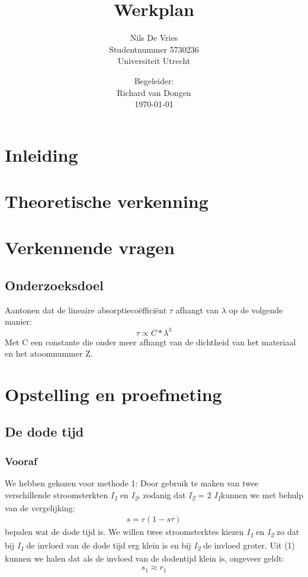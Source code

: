 \documentclass[a4paper]{article}
\begin{document}
\title{Werkplan}
\author{
		\and
		Nils De Vries\\ 
        Studentnummer 5730236  \\
        Universiteit Utrecht
        }

\date{Begeleider: \\ 
Richard van Dongen \\
\today}
\maketitle

\newpage

\section{Inleiding} 
\label{sec:inleiding} 

\section{Theoretische verkenning}
\section{Verkennende vragen}
\subsection{Onderzoeksdoel }
Aantonen dat de lineaire absorptieco\"{e}ffici\"{e}nt $\tau$ afhangt van $\lambda$  op de volgende manier:
$$
\tau \propto C*{\lambda}^3
$$
Met C een constante die onder meer afhangt van de dichtheid van het materiaal en het atoomnummer Z.  
\section{Opstelling en proefmeting}
\subsection{De dode tijd}
\subsubsection{Vooraf}
We hebben gekozen voor methode 1: Door gebruik te maken van twee verschillende stroomsterkten \textit{I\textsubscript{1}} en \textit{I\textsubscript{2}}, zodanig dat \textit{I\textsubscript{2}} = 2 \textit{I\textsubscript{1}}kunnen we met behulp van de vergelijking:
\begin{align}
s=r(1-s\tau)
\end{align}
bepalen wat de dode tijd is.
We willen twee stroomsterktes kiezen \textit{I\textsubscript{1}} en \textit{I\textsubscript{2}} zo dat bij \textit{I\textsubscript{1}} de invloed van de dode tijd erg klein  is en bij \textit{I\textsubscript{2}} de invloed groter. Uit (1) kunnen we halen dat als de invloed van de dodentijd klein is, ongeveer geldt: 
\begin{align}
s_1\approx r_1
\end{align} 
\end{document}
